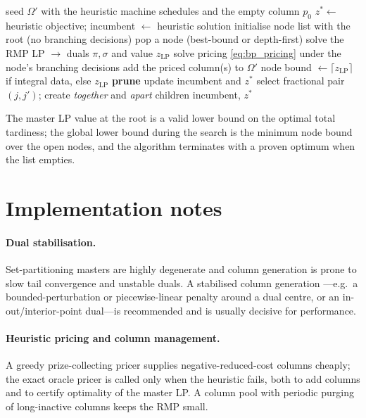\documentclass[review,3p,times,authoryear]{elsarticle}
\newcommand{\Om}{\Omega}
\begin{document}
\begin{algorithm}[H]
\caption{Branch-and-price for parallel-AM total tardiness}
\label{alg:bp}
\begin{algorithmic}[1]
\State seed $\Om'$ with the heuristic machine schedules and the empty column $p_0$
\State $z^\ast\gets$ heuristic objective; incumbent $\gets$ heuristic solution
\State initialise node list with the root (no branching decisions)
  \State pop a node (best-bound or depth-first)
  \Repeat {}
    \State solve the RMP LP $\to$ duals $\pi,\sigma$ and value $z_{\mathrm{LP}}$
    \State solve pricing \eqref{eq:bp_pricing} under the node's branching decisions
     add the priced column(s) to $\Om'$ \EndIf
  \State node bound $\gets \lceil z_{\mathrm{LP}}\rceil$ if integral data, else $z_{\mathrm{LP}}$
   \textbf{prune}
     \State update incumbent and $z^\ast$
  \Else
     \State select fractional pair $(j,j')$; create \emph{together} and \emph{apart} children
  \EndIf
\EndWhile
\State \Return incumbent, $z^\ast$
\end{algorithmic}
\end{algorithm}

The master LP value at the root is a valid lower bound on the optimal total
tardiness; the global lower bound during the search is the minimum node bound
over the open nodes, and the algorithm terminates with a proven optimum when the
list empties.

\section{Implementation notes}
\label{sec:bp_notes}

\paragraph{Dual stabilisation.} Set-partitioning masters are highly degenerate
and column generation is prone to slow tail convergence and unstable duals. A
stabilised column generation \citep{desrosiers2005}---e.g.\ a bounded-perturbation
or piecewise-linear penalty around a dual centre, or an in-out/interior-point
dual---is recommended and is usually decisive for performance.

\paragraph{Heuristic pricing and column management.} A greedy prize-collecting
pricer supplies negative-reduced-cost columns cheaply; the exact oracle pricer is
called only when the heuristic fails, both to add columns and to certify
optimality of the master LP. A column pool with periodic purging of long-inactive
columns keeps the RMP small.
\end{document}
